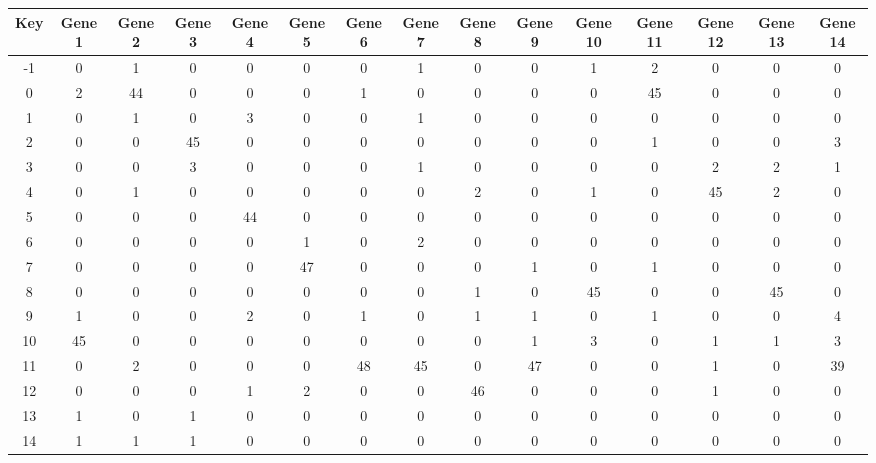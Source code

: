 \begin{tabular}{|c|c|c|c|c|c|c|c|c|c|c|c|c|c|c|}
\hline
Key & Gene 1 & Gene 2 & Gene 3 & Gene 4 & Gene 5 & Gene 6 & Gene 7 & Gene 8 & Gene 9 & Gene 10 & Gene 11 & Gene 12 & Gene 13 & Gene 14 \\
\hline
-1 & 0 & 1 & 0 & 0 & 0 & 0 & 1 & 0 & 0 & 1 & 2 & 0 & 0 & 0 \\
0 & 2 & 44 & 0 & 0 & 0 & 1 & 0 & 0 & 0 & 0 & 45 & 0 & 0 & 0 \\
1 & 0 & 1 & 0 & 3 & 0 & 0 & 1 & 0 & 0 & 0 & 0 & 0 & 0 & 0 \\
2 & 0 & 0 & 45 & 0 & 0 & 0 & 0 & 0 & 0 & 0 & 1 & 0 & 0 & 3 \\
3 & 0 & 0 & 3 & 0 & 0 & 0 & 1 & 0 & 0 & 0 & 0 & 2 & 2 & 1 \\
4 & 0 & 1 & 0 & 0 & 0 & 0 & 0 & 2 & 0 & 1 & 0 & 45 & 2 & 0 \\
5 & 0 & 0 & 0 & 44 & 0 & 0 & 0 & 0 & 0 & 0 & 0 & 0 & 0 & 0 \\
6 & 0 & 0 & 0 & 0 & 1 & 0 & 2 & 0 & 0 & 0 & 0 & 0 & 0 & 0 \\
7 & 0 & 0 & 0 & 0 & 47 & 0 & 0 & 0 & 1 & 0 & 1 & 0 & 0 & 0 \\
8 & 0 & 0 & 0 & 0 & 0 & 0 & 0 & 1 & 0 & 45 & 0 & 0 & 45 & 0 \\
9 & 1 & 0 & 0 & 2 & 0 & 1 & 0 & 1 & 1 & 0 & 1 & 0 & 0 & 4 \\
10 & 45 & 0 & 0 & 0 & 0 & 0 & 0 & 0 & 1 & 3 & 0 & 1 & 1 & 3 \\
11 & 0 & 2 & 0 & 0 & 0 & 48 & 45 & 0 & 47 & 0 & 0 & 1 & 0 & 39 \\
12 & 0 & 0 & 0 & 1 & 2 & 0 & 0 & 46 & 0 & 0 & 0 & 1 & 0 & 0 \\
13 & 1 & 0 & 1 & 0 & 0 & 0 & 0 & 0 & 0 & 0 & 0 & 0 & 0 & 0 \\
14 & 1 & 1 & 1 & 0 & 0 & 0 & 0 & 0 & 0 & 0 & 0 & 0 & 0 & 0 \\
\hline
\end{tabular}